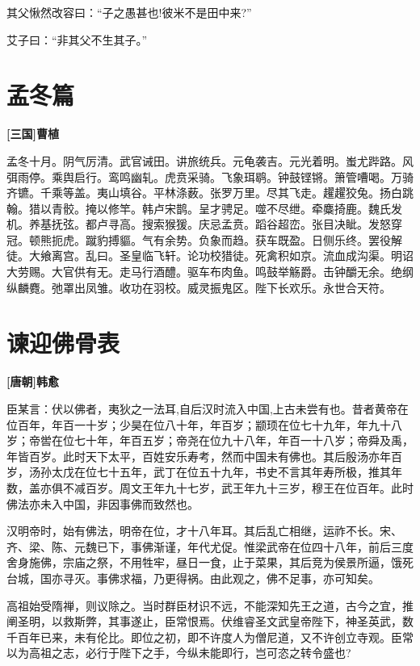 \documentclass[UTF8,titlepage,oneside]{ctexbook}
\begin{document}
其父愀然改容曰：“子之愚甚也!彼米不是田中来?”

艾子曰：“非其父不生其子。”


\chapter*{孟冬篇}
\begin{center}
	\textbf{[三国]曹植}
\end{center}

孟冬十月。阴气厉清。武官诫田。讲旅统兵。元龟袭吉。元光着明。蚩尤跸路。风弭雨停。乘舆启行。鸾鸣幽轧。虎贲采骑。飞象珥鹖。钟鼓铿锵。箫管嘈喝。万骑齐镳。千乘等盖。夷山填谷。平林涤薮。张罗万里。尽其飞走。趯趯狡兔。扬白跳翰。猎以青骹。掩以修竿。韩卢宋鹊。呈才骋足。噬不尽绁。牵麋掎鹿。魏氏发机。养基抚弦。都卢寻高。搜索猴猨。庆忌孟贲。蹈谷超峦。张目决眦。发怒穿冠。顿熊扼虎。蹴豹搏貙。气有余势。负象而趋。获车既盈。日侧乐终。罢役解徒。大飨离宫。乱曰。圣皇临飞轩。论功校猎徒。死禽积如京。流血成沟渠。明诏大劳赐。大官供有无。走马行酒醴。驱车布肉鱼。鸣鼓举觞爵。击钟釂无余。绝纲纵麟麑。弛罩出凤雏。收功在羽校。威灵振鬼区。陛下长欢乐。永世合天符。


\chapter*{谏迎佛骨表}
\begin{center}
	\textbf{[唐朝]韩愈}
\end{center}

臣某言：伏以佛者，夷狄之一法耳,自后汉时流入中国,上古未尝有也。昔者黄帝在位百年，年百一十岁；少昊在位八十年，年百岁；颛顼在位七十九年，年九十八岁；帝喾在位七十年，年百五岁；帝尧在位九十八年，年百一十八岁；帝舜及禹，年皆百岁。此时天下太平，百姓安乐寿考，然而中国未有佛也。其后殷汤亦年百岁，汤孙太戊在位七十五年，武丁在位五十九年，书史不言其年寿所极，推其年数，盖亦俱不减百岁。周文王年九十七岁，武王年九十三岁，穆王在位百年。此时佛法亦未入中国，非因事佛而致然也。

汉明帝时，始有佛法，明帝在位，才十八年耳。其后乱亡相继，运祚不长。宋、齐、梁、陈、元魏已下，事佛渐谨，年代尤促。惟梁武帝在位四十八年，前后三度舍身施佛，宗庙之祭，不用牲牢，昼日一食，止于菜果，其后竞为侯景所逼，饿死台城，国亦寻灭。事佛求福，乃更得祸。由此观之，佛不足事，亦可知矣。

高祖始受隋禅，则议除之。当时群臣材识不远，不能深知先王之道，古今之宜，推阐圣明，以救斯弊，其事遂止，臣常恨焉。伏维睿圣文武皇帝陛下，神圣英武，数千百年已来，未有伦比。即位之初，即不许度人为僧尼道，又不许创立寺观。臣常以为高祖之志，必行于陛下之手，今纵未能即行，岂可恣之转令盛也?
\end{document}
